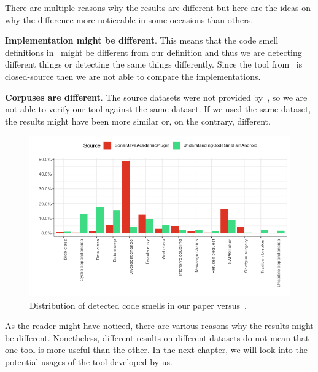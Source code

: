 There are multiple reasons why the results are different but here are the ideas on why the difference more noticeable in
some occasions than others.

\begin{flushleft}
    \textbf{Implementation might be different}.
    This means that the code smell definitions in~\cite{mannan2016understanding} might be different from our definition and thus we are detecting different things or detecting the same things differently.
    Since the tool from~\cite{mannan2016understanding} is closed-source then we are not able to compare the implementations.
\end{flushleft}

\begin{flushleft}
    \textbf{Corpuses are different}.
    The source datasets were not provided by~\citeauthor{mannan2016understanding}, so we are not able to verify our tool against the same dataset.
    If we used the same dataset, the results might have been more similar or, on the contrary, different.
\end{flushleft}

\begin{figure} [htb]
    \includegraphics[scale=0.8]{figures/comparison_2.png}
    \caption{Distribution of detected code smells in our paper versus~\cite{mannan2016understanding}.}
    \label{fig:comparison_of_distributions}
\end{figure}

As the reader might have noticed, there are various reasons why the results might be different.
Nonetheless, different results on different datasets do not mean that one tool is more useful than the other.
In the next chapter, we will look into the potential usages of the tool developed by us.

